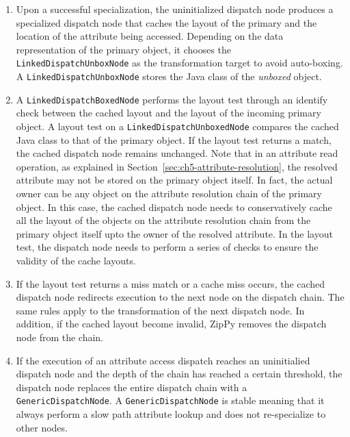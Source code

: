 \begin{enumerate}

\item Upon a successful specialization, the uninitialized dispatch node produces a specialized dispatch node that caches the layout of the primary and the location of the attribute being accessed.
Depending on the data representation of the primary object, it chooses the \texttt{LinkedDispatchUnboxNode} as the transformation target to avoid auto-boxing.
A \texttt{LinkedDispatchUnboxNode} stores the Java class of the \emph{unboxed} object.

\item A \texttt{LinkedDispatchBoxedNode} performs the layout test through an identify check between the cached layout and the layout of the incoming primary object.
A layout test on a \texttt{LinkedDispatchUnboxedNode} compares the cached Java class to that of the primary object.
If the layout test returns a match, the cached dispatch node remains unchanged.
Note that in an attribute read operation, as explained in Section~\ref{sec:ch5-attribute-resolution}, the resolved attribute may not be stored on the primary object itself.
In fact, the actual owner can be any object on the attribute resolution chain of the primary object.
In this case, the cached dispatch node needs to conservatively cache all the layout of the objects on the attribute resolution chain from the primary object itself upto the owner of the resolved attribute.
In the layout test, the dispatch node needs to perform a series of checks to ensure the validity of the cache layouts.

\item If the layout test returns a miss match or a cache miss occurs, the cached dispatch node redirects execution to the next node on the dispatch chain.
The same rules apply to the transformation of the next dispatch node.
In addition, if the cached layout become invalid, ZipPy removes the dispatch node from the chain.

\item If the execution of an attribute access dispatch reaches an uninitialied dispatch node and the depth of the chain has reached a certain threshold,
the dispatch node replaces the entire dispatch chain with a \texttt{GenericDispatchNode}.
A \texttt{GenericDispatchNode} is stable meaning that it always perform a slow path attribute lookup and does not re-specialize to other nodes.

\end{enumerate}

